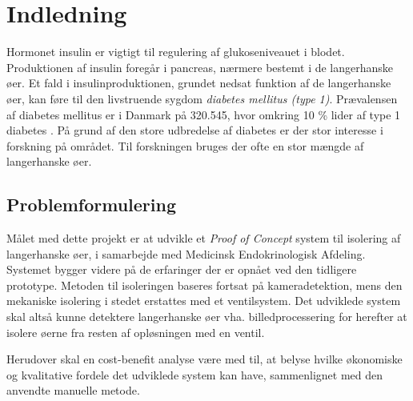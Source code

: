 \chapter{Indledning}
Hormonet insulin er vigtigt til regulering af glukoseniveauet i blodet. Produktionen af insulin foregår i pancreas, nærmere bestemt i de langerhanske øer. Et fald i insulinproduktionen, grundet nedsat funktion af de langerhanske øer, kan føre til den livstruende sygdom \textit{diabetes mellitus (type 1)}. Prævalensen af diabetes mellitus er i Danmark på 320.545, hvor omkring 10 \% lider af type 1 diabetes \citep{diabetes}. På grund af den store udbredelse af diabetes er der stor interesse i forskning på området. Til forskningen bruges der ofte en stor mængde af langerhanske øer. 





\section{Problemformulering}

Målet med dette projekt er at udvikle et \textit{Proof of Concept} system til isolering af langerhanske øer, i samarbejde med Medicinsk Endokrinologisk Afdeling. Systemet bygger videre på de erfaringer der er opnået ved den tidligere prototype. Metoden til isoleringen baseres fortsat på kameradetektion, mens den mekaniske isolering i stedet erstattes med et ventilsystem. Det udviklede system skal altså kunne detektere langerhanske øer vha. billedprocessering for herefter at isolere øerne fra resten af opløsningen med en ventil. 

Herudover skal en cost-benefit analyse være med til, at belyse hvilke økonomiske og kvalitative fordele det udviklede system kan have, sammenlignet med den anvendte manuelle metode.

